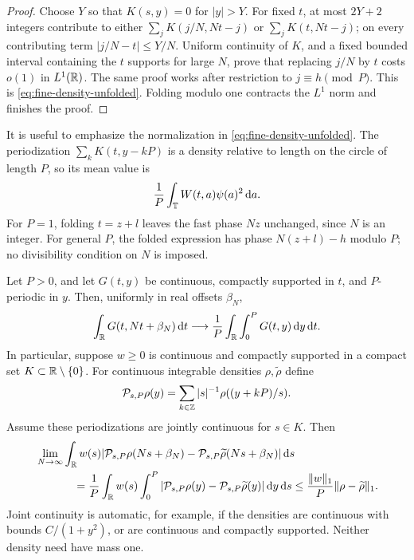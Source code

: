 \begin{proof}
Choose $Y$ so that $K(s,y)=0$ for $|y|>Y$. For fixed $t$, at most
$2Y+2$ integers contribute to either
$\sum_j K(j/N,Nt-j)$ or $\sum_jK(t,Nt-j)$; on every contributing
term $|j/N-t|\le Y/N$. Uniform continuity of $K$, and a fixed
bounded interval containing the $t$ supports for large $N$, prove
that replacing $j/N$ by $t$ costs $o(1)$ in $L^1(\mathbb R)$.
The same proof works after restriction to $j\equiv h\pmod P$.
This is \eqref{eq:fine-density-unfolded}. Folding modulo one
contracts the $L^1$ norm and finishes the proof.
\end{proof}

It is useful to emphasize the normalization in
\eqref{eq:fine-density-unfolded}. The periodization
$\sum_k K(t,y-kP)$ is a density relative to length on the circle of
length $P$, so its mean value is
\begin{equation}\label{eq:residue-mean}
 \frac1P\int_\mathbb T W(t,a)\psi(a)^2\,\mathrm d a.
\end{equation}
For $P=1$, folding $t=z+l$ leaves the fast phase $Nz$ unchanged,
since $N$ is an integer. For general $P$, the folded expression has
phase $N(z+l)-h$ modulo $P$; no divisibility condition on $N$ is
imposed.

\begin{lemma}\label{lem:fast-average}
Let $P>0$, and let $G(t,y)$ be continuous, compactly supported in $t$,
and $P$-periodic in $y$. Then, uniformly in real offsets $\beta_N$,
\begin{equation}\label{eq:fast-average}
 \int_\mathbb R G(t,Nt+\beta_N)\,\mathrm d t
 \longrightarrow \frac1P\int_\mathbb R\int_0^P G(t,y)\,\mathrm d y\,\mathrm d t.
\end{equation}
In particular, suppose $w\ge0$ is continuous and compactly supported
in a compact set $K\subset\mathbb R\setminus\{0\}$. For continuous
integrable densities $\rho,\widetilde\rho$ define
\[
 \mathcal P_{s,P}\rho(y)
     =\sum_{k\in\mathbb Z}|s|^{-1}\rho((y+kP)/s).
\]
Assume these periodizations are jointly continuous for $s\in K$.
Then
\begin{align}\label{eq:law-diagonal-comparison}
 &\lim_{N\to\infty}
 \int_\R w(s)
 |\mathcal P_{s,P}\rho(Ns+\beta_N)
       -\mathcal P_{s,P}\widetilde\rho(Ns+\beta_N)|\dd s\\
 &\hspace{12mm}=
 \frac1P\int_\R w(s)\int_0^P
 |\mathcal P_{s,P}\rho(y)-\mathcal P_{s,P}\widetilde\rho(y)|
       \dd y\dd s
 \le\frac{\|w\|_1}{P}\|\rho-\widetilde\rho\|_1.\notag
\end{align}
Joint continuity is automatic, for example, if the densities are
continuous with bounds $C/(1+y^2)$, or are continuous and compactly
supported. Neither density need have mass one.
\end{lemma}

